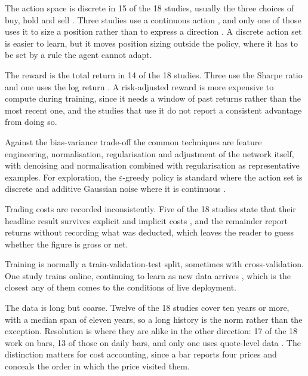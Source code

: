 The action space is discrete in 15 of the 18 studies, usually the three choices of buy, hold and sell \cite{rundo_deep_2019, saini_stock_2019, xiong_practical_2018}. Three studies use a continuous action \cite{majidi_algorithmic_2022, jia_lstm-ddpg_2021, zhang_deep_2020}, and only one of those uses it to size a position rather than to express a direction \cite{jia_lstm-ddpg_2021}. A discrete action set is easier to learn, but it moves position sizing outside the policy, where it has to be set by a rule the agent cannot adapt.

The reward is the total return in 14 of the 18 studies. Three use the Sharpe ratio \cite{kong_empirical_2023, sagiraju_application_2021, jia_lstm-ddpg_2021} and one uses the log return \cite{majidi_algorithmic_2022}. A risk-adjusted reward is more expensive to compute during training, since it needs a window of past returns rather than the most recent one, and the studies that use it do not report a consistent advantage from doing so.

Against the bias-variance trade-off the common techniques are feature engineering, normalisation, regularisation and adjustment of the network itself, with denoising \cite{li_deep_2019} and normalisation combined with regularisation \cite{theate_application_2021} as representative examples. For exploration, the \(\varepsilon\)-greedy policy is standard where the action set is discrete and additive Gaussian noise where it is continuous \cite{wu_adaptive_2020, majidi_algorithmic_2022}.

Trading costs are recorded inconsistently. Five of the 18 studies state that their headline result survives explicit and implicit costs \cite{huang_financial_2018, gran_deep_2019, yang_deep_2020, jia_lstm-ddpg_2021, zhang_deep_2020}, and the remainder report returns without recording what was deducted, which leaves the reader to guess whether the figure is gross or net.

Training is normally a train-validation-test split, sometimes with cross-validation. One study trains online, continuing to learn as new data arrives \cite{huang_financial_2018}, which is the closest any of them comes to the conditions of live deployment.

The data is long but coarse. Twelve of the 18 studies cover ten years or more, with a median span of eleven years, so a long history is the norm rather than the exception. Resolution is where they are alike in the other direction: 17 of the 18 work on bars, 13 of those on daily bars, and only one uses quote-level data \cite{carapuco_reinforcement_2018}. The distinction matters for cost accounting, since a bar reports four prices and conceals the order in which the price visited them.